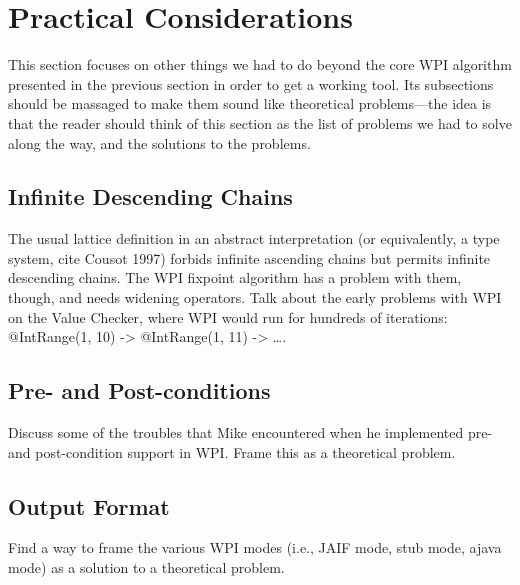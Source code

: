 \section{Practical Considerations}
\label{sec:difficulties}

This section focuses on other things we had to do beyond
the core WPI algorithm presented in the previous section
in order to get a working tool. Its subsections should
be massaged to make them sound like theoretical problems---the idea
is that the reader should think of this section as the list of
problems we had to solve along the way, and the solutions to
the problems.

\subsection{Infinite Descending Chains}
\label{sec:infinite-descending-chains}

The usual lattice definition in an abstract interpretation
(or equivalently, a type system, cite Cousot 1997) forbids
infinite ascending chains but permits infinite descending chains.
The WPI fixpoint algorithm has a problem with them, though, and
needs widening operators. Talk about the early problems
with WPI on the Value Checker, where WPI would run for hundreds of
iterations: @IntRange(1, 10) -> @IntRange(1, 11) -> \ldots.

\subsection{Pre- and Post-conditions}
\label{sec:pre-post-conditions}

Discuss some of the troubles that Mike encountered when
he implemented pre- and post-condition support in WPI. Frame
this as a theoretical problem.

\subsection{Output Format}
\label{sec:output}

Find a way to frame the various WPI modes (i.e., JAIF mode,
stub mode, ajava mode) as a solution to a theoretical problem.

